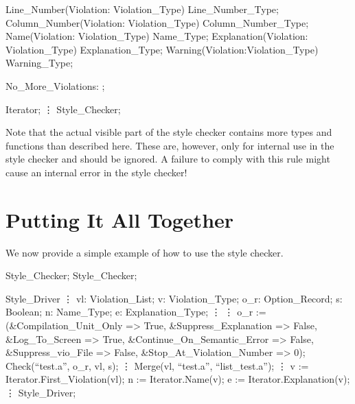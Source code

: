     \Function Line_Number(Violation: Violation_Type) \Return Line_Number_Type;
    \Function Column_Number(Violation: Violation_Type) \Return Column_Number_Type;
    \Function Name(Violation: Violation_Type) \Return Name_Type;
    \Function Explanation(Violation: Violation_Type) \Return Explanation_Type;
    \Function Warning(Violation:Violation_Type) \Return Warning_Type;

    No_More_Violations: \Exception;

  \End Iterator;
\vdots
\End Style_Checker;
\apeend

\noindent
Note that the actual visible part of the style checker contains more types
and functions than described here. These are, however, only for internal
use in the style checker and should be ignored. A failure to comply with
this rule might cause an internal error in the style checker!


\section{Putting It All Together}

We now provide a simple example of how to use the style checker.

\apebegin\bhinge
\With Style_Checker;
\Use Style_Checker;

\Procedure Style_Driver \Is
  \vdots
  vl: Violation_List;
  v: Violation_Type;
  o_r: Option_Record;
  s: Boolean;
  n: Name_Type;
  e: Explanation_Type;
  \vdots
\Begin
  \vdots
  o_r := (&Compilation_Unit_Only => True,
&Suppress_Explanation => False,
&Log_To_Screen => True,
&Continue_On_Semantic_Error => False,
&Suppress_vio_File => False,
&Stop_At_Violation_Number => 0);
  Check(``test.a'', o_r, vl, s);
  \vdots
  Merge(vl, ``test.a'', ``list_test.a'');
  \vdots
  v := Iterator.First_Violation(vl);
  n := Iterator.Name(v);
  e := Iterator.Explanation(v);
  \vdots
\End Style_Driver;
\apeend
